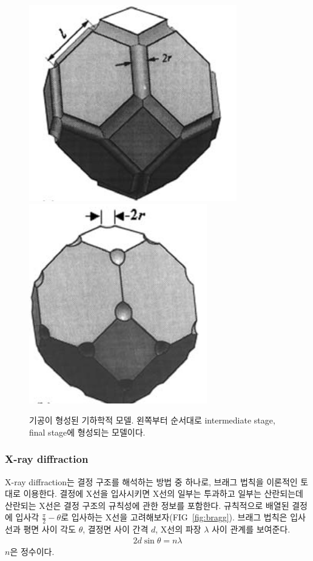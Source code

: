 \documentclass[aps,reprint,superscriptaddress,11pt]{revtex4-2}
\begin{document}
\begin{figure}[htbp]
  \centering
  \includegraphics[scale=0.25]{intermediate.png}
  \includegraphics[scale=0.25]{final.png}
  \caption{기공이 형성된 기하학적 모델. 왼쪽부터 순서대로 intermediate stage,
  final stage에 형성되는 모델이다.}\label{fig:inter}
\end{figure}



 \subsubsection{X-ray diffraction}
X-ray diffraction는 결정 구조를 해석하는 방법 중 하나로, 브래그 법칙을 이론적인
토대로 이용한다. 결정에 X선을 입사시키면 X선의 일부는 투과하고 일부는 산란되는데
산란되는 X선은 결정 구조의 규칙성에 관한 정보를 포함한다. 규칙적으로 배열된 결정에
입사각 $\frac{\pi}{2}-\theta$로 입사하는 X선을 고려해보자(FIG~\ref{fig:bragg}).
브래그 법칙은 입사선과 평면 사이 각도 $\theta$, 결정면 사이 간격 $d$, X선의 파장 
$\lambda$ 사이 관계를 보여준다.
\begin{align}
  2d\sin{\theta} = n\lambda
\end{align}
$n$은 정수이다.
\end{document}
